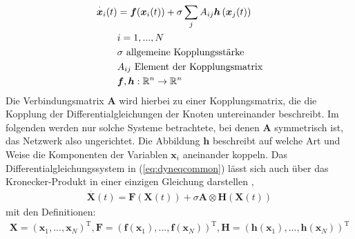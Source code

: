 \begin{align}\label{eq:dyneqcommon}
\overset{\cdot}{\boldsymbol{x}}_i(t)&=\boldsymbol{f}(\boldsymbol{x}_i(t))+\sigma\sum_j A_{ij}\boldsymbol{h}\left(\boldsymbol{x}_j(t)\right)
\\\notag & i=1,...,N
\\\notag & \sigma \text{ allgemeine Kopplungsstärke}
\\\notag & A_{ij}\text{ Element der Kopplungsmatrix}
\\\notag & \boldsymbol{f},\boldsymbol{h}:\mathbb{R}^n\rightarrow\mathbb{R}^n
\end{align}
Die Verbindungsmatrix $\boldsymbol{A}$ wird hierbei zu einer Kopplungsmatrix, die die Kopplung der Differentialgleichungen der Knoten untereinander beschreibt. Im folgenden werden nur solche Systeme betrachtete, bei denen $\boldsymbol{A}$ symmetrisch ist, das Netzwerk also ungerichtet. Die Abbildung $\boldsymbol{h}$ beschreibt auf welche Art und Weise die Komponenten der Variablen $\boldsymbol{x}_i$ aneinander koppeln. Das Differentialgleichungssystem in (\ref*{eq:dyneqcommon}) lässt sich auch über das Kronecker-Produkt in einer einzigen Gleichung darstellen \citep{pecora1998},
\begin{align}
\overset{\cdot}{\boldsymbol{X}}(t)=\boldsymbol{F}(\boldsymbol{X}(t))+\sigma\boldsymbol{A}\otimes\boldsymbol{H}(\boldsymbol{X}(t))
\end{align}
mit den Definitionen:
\begin{align*}
\boldsymbol{X}=\left(\boldsymbol{x}_1,...,\boldsymbol{x}_N\right)^{\text{T}},
\boldsymbol{F}=\left(\boldsymbol{f}(\boldsymbol{x}_1),...,\boldsymbol{f}(\boldsymbol{x}_N)\right)^{\text{T}},
\boldsymbol{H}=\left(\boldsymbol{h}(\boldsymbol{x}_1),...,\boldsymbol{h}(\boldsymbol{x}_N)\right)^{\text{T}}
\end{align*}


